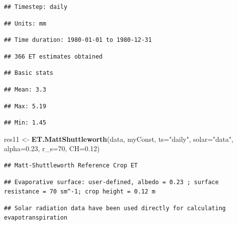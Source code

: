 \documentclass[
]{book}
\newenvironment{Shaded}{\begin{snugshade}}{\end{snugshade}}
\newcommand{\DataTypeTok}[1]{\textcolor[rgb]{0.13,0.29,0.53}{#1}}
\newcommand{\DecValTok}[1]{\textcolor[rgb]{0.00,0.00,0.81}{#1}}
\newcommand{\FloatTok}[1]{\textcolor[rgb]{0.00,0.00,0.81}{#1}}
\newcommand{\KeywordTok}[1]{\textcolor[rgb]{0.13,0.29,0.53}{\textbf{#1}}}
\newcommand{\NormalTok}[1]{#1}
\newcommand{\StringTok}[1]{\textcolor[rgb]{0.31,0.60,0.02}{#1}}
\begin{document}
\begin{verbatim}
## Timestep: daily
\end{verbatim}

\begin{verbatim}
## Units: mm
\end{verbatim}

\begin{verbatim}
## Time duration: 1980-01-01 to 1980-12-31
\end{verbatim}

\begin{verbatim}
## 366 ET estimates obtained
\end{verbatim}

\begin{verbatim}
## Basic stats
\end{verbatim}

\begin{verbatim}
## Mean: 3.3
\end{verbatim}

\begin{verbatim}
## Max: 5.19
\end{verbatim}

\begin{verbatim}
## Min: 1.45
\end{verbatim}

\begin{Shaded}
\begin{Highlighting}[]
\NormalTok{res11 <-}\StringTok{ }\KeywordTok{ET.MattShuttleworth}\NormalTok{(data, myConst, }\DataTypeTok{ts=}\StringTok{"daily"}\NormalTok{,}
                             \DataTypeTok{solar=}\StringTok{"data"}\NormalTok{, }\DataTypeTok{alpha=}\FloatTok{0.23}\NormalTok{, }\DataTypeTok{r_s=}\DecValTok{70}\NormalTok{, }\DataTypeTok{CH=}\FloatTok{0.12}\NormalTok{)}
\end{Highlighting}
\end{Shaded}

\begin{verbatim}
## Matt-Shuttleworth Reference Crop ET
\end{verbatim}

\begin{verbatim}
## Evaporative surface: user-defined, albedo = 0.23 ; surface resistance = 70 sm^-1; crop height = 0.12 m
\end{verbatim}

\begin{verbatim}
## Solar radiation data have been used directly for calculating evapotranspiration
\end{verbatim}
\end{document}
